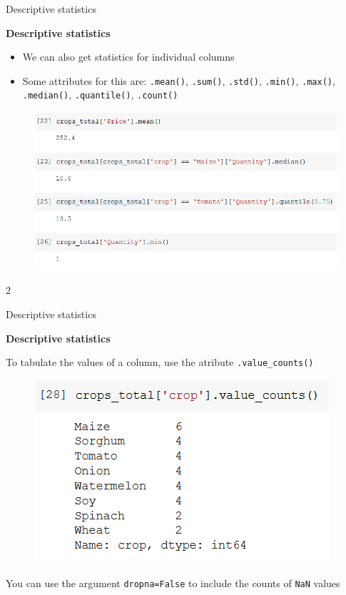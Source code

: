 \documentclass[aspectratio=169]{beamer}
\begin{document}
\begin{frame}{Descriptive statistics}

	\textbf{Descriptive statistics}

	\begin{multicols}{2}

		\begin{itemize}
			\item We can also get statistics for individual columns
			\item Some attributes for this are: \texttt{.mean()}, \texttt{.sum()}, \texttt{.std()}, \texttt{.min()}, \texttt{.max()}, \texttt{.median()}, \texttt{.quantile()}, \texttt{.count()}
		\end{itemize}

		\begin{figure}
			\centering
			\includegraphics[width=\linewidth]{img/desc_stats.png}
		\end{figure}

	\end{multicols}{2}

\end{frame}

\begin{frame}{Descriptive statistics}

	\textbf{Descriptive statistics}

	To tabulate the values of a column, use the atribute \texttt{.value\_counts()}

	\begin{figure}
		\centering
		\includegraphics[width=0.5\linewidth]{img/value_counts.png}
	\end{figure}

	You can use the argument \texttt{dropna=False} to include the counts of \texttt{NaN} values

\end{frame}
\end{document}
